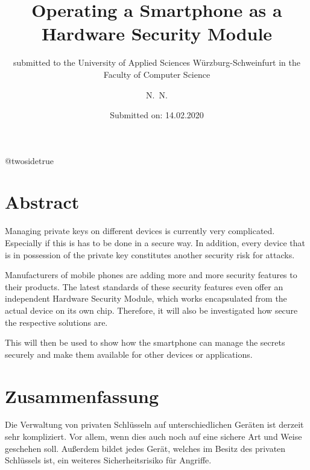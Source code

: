 \documentclass[12pt,oneside,a4paper,parskip]{scrbook}
\makeatletter
\def\BaAuthor{Achim Winter}
\def\BaAuthorStudyProgram{Computer Science}
\def\BaType{Bachelor thesis}
\def\BaTitle{Operating a Smartphone as a Hardware Security Module}
\def\BaSupervisorOne{Prof.\ Dr.\ Junker-Schilling}
\def\BaSupervisorTwo{Prof.\ Dr.\ Huffstadt}
\def\BaDeadline{14.02.2020}
\def\ShowBaAuthor{\BaAuthor}
\def\ShowBaAuthor{N.~N.}
\newcommand*{\forcetwosidetitle}[1][1]{%
 \begingroup
   \cleardoubleoddpage
   \KOMAoptions{titlepage=true}%
   \csname @twosidetrue\endcsname
   \maketitle[{#1}]
 \endgroup
}
\makeatother
\begin{document}


\frontmatter
\titlehead{%
  {University of applied Sciences W\"{u}rzburg-Schweinfurt\\
   Faculty of Computer Science and Business Informatics}}
\subject{\BaType}
\title{\BaTitle\\[15mm]}
\subtitle{\normalsize{submitted to the University of Applied Sciences W\"{u}rzburg-Schweinfurt in the Faculty of \BaAuthorStudyProgram}}
\author{\ShowBaAuthor}
\date{\normalsize{Submitted on: \BaDeadline}}
\publishers{
  \normalsize{First Supervisor: \BaSupervisorOne}\\
  \normalsize{Second Supervisor: \BaSupervisorTwo}\\
}

\forcetwosidetitle



\section*{Abstract}
Managing private keys on different devices is currently very complicated. Especially if this is has to be done in a secure way. In addition, every device that is in possession of the private key constitutes another security risk for attacks. 

Manufacturers of mobile phones are adding more and more security features to their products. The latest standards of these security features even offer an independent Hardware Security Module, which works encapsulated from the actual device on its own chip. Therefore, it will also be investigated how secure the respective solutions are.

This will then be used to show how the smartphone can manage the secrets securely and make them available for other devices or applications.



\section*{Zusammenfassung}
Die Verwaltung von privaten Schlüsseln auf unterschiedlichen Geräten ist derzeit sehr kompliziert. Vor allem, wenn dies auch noch auf eine sichere Art und Weise geschehen soll. Außerdem bildet jedes Gerät, welches im Besitz des privaten Schlüssels ist, ein weiteres Sicherheitsrisiko für Angriffe. 
\end{document}
